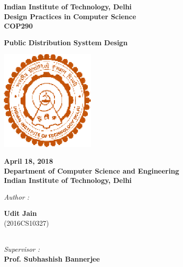\documentclass[12pt]{report}
\begin{document}
\begin{center}
\LARGE{\textbf{Indian Institute of Technology, Delhi}}\\
\vspace{0.8cm}
\large{\textbf{Design Practices in Computer Science}}\\[5pt]
\large{\textbf{COP290}}\\[5pt]

\vspace{0.5cm}

\large{\textbf{Public Distribution Systtem Design}}

\begin{center}
\includegraphics[height=5cm]{iitd.eps}
\end{center}
\vspace{0.2cm}

\textbf{April 18, 2018} \\
\textbf{Department of Computer Science and Engineering} \\
\textbf{Indian Institute of Technology, Delhi}\\


\vspace{1.5cm}

\begin{multicols*}{2}

\begin{flushleft}

\textit{Author :\\ }


\textbf{Udit Jain} \\
(2016CS10327)\\

\end{flushleft}


\columnbreak

\begin{flushleft}

\textit{\\Supervisor :\\ }
\textbf{Prof. Subhashish Bannerjee} \\[5pt]

\end{flushleft}

\end{multicols*}

\end{center}
\end{document}
